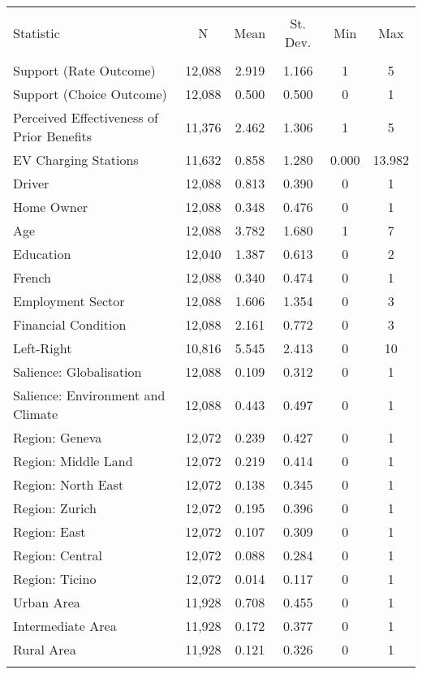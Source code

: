 
\begin{table}[!htbp] \centering 
  \caption{} 
  \label{tab:summary_stats} 
\footnotesize 
\begin{tabular}{@{\extracolsep{3pt}}lccccc} 
\\[-1.8ex]\hline 
\hline \\[-1.8ex] 
Statistic & \multicolumn{1}{c}{N} & \multicolumn{1}{c}{Mean} & \multicolumn{1}{c}{St. Dev.} & \multicolumn{1}{c}{Min} & \multicolumn{1}{c}{Max} \\ 
\hline \\[-1.8ex] 
Support (Rate Outcome) & 12,088 & 2.919 & 1.166 & 1 & 5 \\ 
Support (Choice Outcome) & 12,088 & 0.500 & 0.500 & 0 & 1 \\ 
Perceived Effectiveness of Prior Benefits & 11,376 & 2.462 & 1.306 & 1 & 5 \\ 
EV Charging Stations & 11,632 & 0.858 & 1.280 & 0.000 & 13.982 \\ 
Driver & 12,088 & 0.813 & 0.390 & 0 & 1 \\ 
Home Owner & 12,088 & 0.348 & 0.476 & 0 & 1 \\ 
Age & 12,088 & 3.782 & 1.680 & 1 & 7 \\ 
Education & 12,040 & 1.387 & 0.613 & 0 & 2 \\ 
French & 12,088 & 0.340 & 0.474 & 0 & 1 \\ 
Employment Sector & 12,088 & 1.606 & 1.354 & 0 & 3 \\ 
Financial Condition & 12,088 & 2.161 & 0.772 & 0 & 3 \\ 
Left-Right & 10,816 & 5.545 & 2.413 & 0 & 10 \\ 
Salience: Globalisation & 12,088 & 0.109 & 0.312 & 0 & 1 \\ 
Salience: Environment and Climate & 12,088 & 0.443 & 0.497 & 0 & 1 \\ 
Region: Geneva & 12,072 & 0.239 & 0.427 & 0 & 1 \\ 
Region: Middle Land & 12,072 & 0.219 & 0.414 & 0 & 1 \\ 
Region: North East & 12,072 & 0.138 & 0.345 & 0 & 1 \\ 
Region: Zurich & 12,072 & 0.195 & 0.396 & 0 & 1 \\ 
Region: East & 12,072 & 0.107 & 0.309 & 0 & 1 \\ 
Region: Central & 12,072 & 0.088 & 0.284 & 0 & 1 \\ 
Region: Ticino & 12,072 & 0.014 & 0.117 & 0 & 1 \\ 
Urban Area & 11,928 & 0.708 & 0.455 & 0 & 1 \\ 
Intermediate Area & 11,928 & 0.172 & 0.377 & 0 & 1 \\ 
Rural Area & 11,928 & 0.121 & 0.326 & 0 & 1 \\ 
\hline \\[-1.8ex] 
\end{tabular} 
\end{table} 
